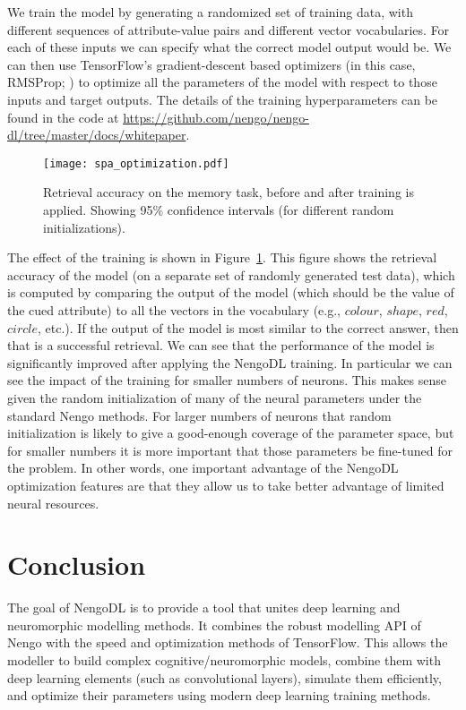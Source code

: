 \documentclass{article}
\begin{document}
We train the model by generating a randomized set of training data, with different sequences of attribute-value pairs and different vector vocabularies.  For each of these inputs we can specify what the correct model output would be.  We can then use TensorFlow's gradient-descent based optimizers (in this case, RMSProp; \citealt{Tieleman2012}) to optimize all the parameters of the model with respect to those inputs and target outputs.  The details of the training hyperparameters can be found in the code at \url{https://github.com/nengo/nengo-dl/tree/master/docs/whitepaper}.

\begin{figure}
\centering
\texttt{[image: spa\_optimization.pdf]}
\caption{Retrieval accuracy on the memory task, before and after training is applied.  Showing 95\% confidence intervals (for different random initializations).}
\label{fig:spa_optimization}
\end{figure}

The effect of the training is shown in Figure~\ref{fig:spa_optimization}.  This figure shows the retrieval accuracy of the model (on a separate set of randomly generated test data), which is computed by comparing the output of the model (which should be the value of the cued attribute) to all the vectors in the vocabulary (e.g., $colour$, $shape$, $red$, $circle$, etc.).  If the output of the model is most similar to the correct answer, then that is a successful retrieval.  We can see that the performance of the model is significantly improved after applying the NengoDL training.  In particular we can see the impact of the training for smaller numbers of neurons.  This makes sense given the random initialization of many of the neural parameters under the standard Nengo methods. For larger numbers of neurons that random initialization is likely to give a good-enough coverage of the parameter space, but for smaller numbers it is more important that those parameters be fine-tuned for the problem.  In other words, one important advantage of the NengoDL optimization features are that they allow us to take better advantage of limited neural resources.

\section{Conclusion}

The goal of NengoDL is to provide a tool that unites deep learning and neuromorphic modelling methods.  It combines the robust modelling API of Nengo with the speed and optimization methods of TensorFlow.  This allows the modeller to build complex cognitive/neuromorphic models, combine them with deep learning elements (such as convolutional layers), simulate them efficiently, and optimize their parameters using modern deep learning training methods.
\end{document}
